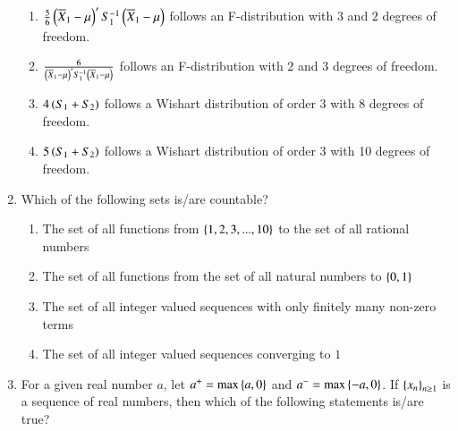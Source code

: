 \documentclass[journal,12pt,onecolumn]{IEEEtran}
\theoremstyle{remark}
\begin{document}
\begin{enumerate}
\begin{enumerate}
\item $\frac{5}{6}\left(\overline{X}_1 - \mu\right)^\prime S_1^{-1}\left(\overline{X}_1 - \mu\right)$ follows an F-distribution with $3$ and $2$ degrees of freedom.\\
\item  $\frac{6}{\left(\overline{X}_1 - \mu\right)^\prime S_1^{-1}\left(\overline{X}_1 - \mu\right)}$ follows an F-distribution with $2$ and $3$ degrees of freedom.\\
\item $4\left(S_1 + S_2\right)$ follows a Wishart distribution of order 3 with 8 degrees of freedom.
\item $5\left(S_1 + S_2\right)$ follows a Wishart distribution of order 3 with 10 degrees of freedom.
\end{enumerate}  
\item  Which of the following sets is/are countable?

\begin{enumerate}
\item The set of all functions from $\left\{1, 2, 3, ..., 10\right\}$ to the set of all rational numbers
\item The set of all functions from the set of all natural numbers to $\left\{0,1\right\}$
\item The set of all integer valued sequences with only finitely many non-zero terms
\item The set of all integer valued sequences converging to $1$
\end{enumerate}

\item For a given real number $a$, let $a^+ = \max\left\{a,0\right\}$ and $a^- = \max\left\{-a,0\right\}$.
      If $\left\{x_n\right\}_{n\ge1}$ is a sequence of real numbers, then which of the following statements is/are true?


\end{enumerate}
\end{document}
